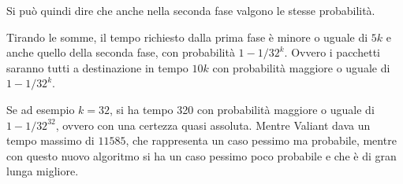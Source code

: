 Si può quindi dire che anche nella seconda fase valgono le stesse probabilità.

Tirando le somme, il tempo richiesto dalla prima fase è minore o uguale di $5k$ e anche quello della seconda fase, con probabilità $ 1-1/32^{k}$.
Ovvero i pacchetti saranno tutti a destinazione in tempo $10k$ con probabilità maggiore o uguale di $1- 1/32^k$.

Se ad esempio $k = 32$, si ha tempo 320 con probabilità maggiore o uguale di $1 - 1/32^{32}$, ovvero con una certezza quasi assoluta. 
Mentre Valiant dava un tempo massimo di $11585$, che rappresenta un caso pessimo ma probabile, mentre con questo nuovo algoritmo si ha un caso pessimo poco probabile e che è di gran lunga migliore.
